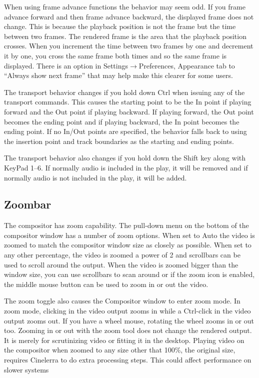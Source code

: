 When using frame advance functions the behavior may seem odd. 
If you frame advance forward and then frame advance backward, the displayed frame does not change. 
This is because the playback position is not the frame but the time between two frames. 
The rendered frame is the area that the playback position crosses. 
When you increment the time between two frames by one and decrement it by one, you cross the same frame both times and so the same frame is displayed.  
There is an option in Settings$\rightarrow$Preferences, Appearance tab to “Always show next frame” that may help make this clearer for some users.

The transport behavior changes if you hold down Ctrl when issuing any of the transport commands. This causes the starting point to be the In point if playing forward and the Out point if playing backward. If playing forward, the Out point becomes the ending point and if playing backward, the In point becomes the ending point. If no In/Out points are specified, the behavior falls back to using the insertion point and track boundaries as the starting and ending points.

The transport behavior also changes if you hold down the Shift key along with KeyPad 1--6.  
If normally audio is included in the play, it will be removed and if normally audio is not included in the play, it will be added.


\subsection{Zoombar}%
\label{sub:zoombar}

The compositor has zoom capability. 
The pull-down menu on the bottom of the compositor window has a number of zoom options. 
When set to Auto the video is zoomed to match the compositor window size as closely as possible. 
When set to any other percentage, the video is zoomed a power of 2 and scrollbars can be used to scroll around the output. 
When the video is zoomed bigger than the window size,  you can use scrollbars to scan around or if the zoom icon is enabled, the middle mouse button can be used to zoom in or out the video.

The zoom toggle also causes the Compositor window to enter zoom mode. 
In zoom mode, clicking in the video output zooms in while a Ctrl-click in the video output zooms out. 
If you have a wheel mouse, rotating the wheel zooms in or out too. 
Zooming in or out with the zoom tool does not change the rendered output. 
It is merely for scrutinizing video or fitting it in the desktop. Playing video on the compositor when zoomed to any size other that 100\%, the original size, requires Cinelerra to do extra processing steps. 
This could affect performance on slower systems

